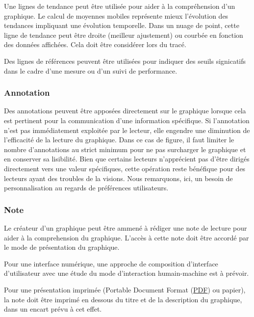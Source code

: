 \documentclass[a4paper,12pt]{article}
\begin{document}
\begin{multicols}{2}
Une lignes de tendance peut être utilisée pour aider à la compréhension d'un graphique. Le calcul de moyennes mobiles représente mieux l'évolution des tendances impliquant une évolution temporelle. Dans un nuage de point, cette ligne de tendance peut être droite (meilleur ajustement) ou courbée en fonction des données affichées. Cela doit être considérer lors du tracé. \autocite{stephenfewComponentlevelGraphDesign2012}

Des lignes de références peuvent être utilisées pour indiquer des seuils signicatifs dans le cadre d'une mesure ou d'un suivi de performance. \autocite{stephenfewComponentlevelGraphDesign2012}
\subsubsection{Annotation}
\label{sec:orgd1541be}
Des annotations peuvent être apposées directement sur le graphique lorsque cela est pertinent pour la communication d'une information spécifique. Si l'annotation n'est pas immédiatement exploitée par le lecteur, elle engendre une diminution de l'efficacité de la lecture du graphique. \autocite{tranDiscoveringAccessibleData2024} Dans ce cas de figure, il faut limiter le nombre d'annotations au strict minimum pour ne pas surcharger le graphique et en conserver sa lisibilité. \autocite{stephenfewComponentlevelGraphDesign2012} Bien que certains lecteurs n'apprécient pas d'être dirigés directement vers une valeur spécifiques, \autocite{tranDiscoveringAccessibleData2024} cette opération reste bénéfique pour des lecteurs ayant des troubles de la visions. \autocite{dougschepersDesigningDataCognitive2022} Nous remarquons, ici, un besoin de personnalisation au regards de préférences utilisateurs.
\subsubsection{Note}
\label{sec:org5ccb39d}
Le créateur d'un graphique peut être ammené à rédiger une note de lecture pour aider à la comprehension du graphique. L'accès à cette note doit être accordé par le mode de présentation du graphique. \autocite{jonathanschwabishDevelopingDataVisualization2021}

Pour une interface numérique, une approche de composition d'interface d'utilisateur avec une étude du mode d'interaction humain-machine est à prévoir.

Pour une présentation imprimée (Portable Document Format
 (\protect\hyperlink{gls-19}{\label{gls-19-use-1}PDF}) ou papier), la note doit être imprimé en dessous du titre et de la description du graphique, dans un encart prévu à cet effet.

\end{multicols}
\end{document}
